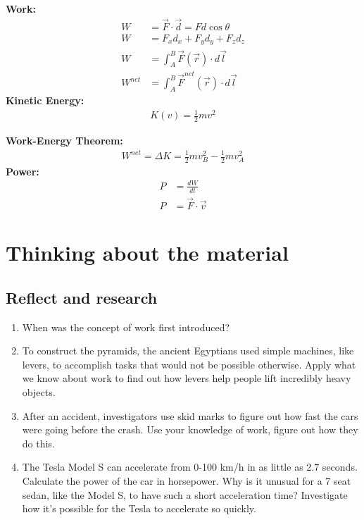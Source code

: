 \begin{importantEquations}
\begin{multicols}{2}
\textbf{Work:}
\begin{align*}
W &= \vec F \cdot \vec d = Fd\cos\theta\\
W &= F_xd_x+F_yd_y+F_zd_z\\
W &=\int_A^B \vec F(\vec r) \cdot  d\vec l\\
W^{net} &= \int_A^B \vec F^{net}(\vec r) \cdot d\vec l
\end{align*}
\textbf{Kinetic Energy:}
\begin{align*}
K(v) = \frac{1}{2} mv^2
\end{align*}
\columnbreak

\textbf{Work-Energy Theorem:}
\begin{align*}
W^{net} = \Delta K = \frac{1}{2} mv_B^2 - \frac{1}{2} mv_A^2
\end{align*}
\textbf{Power:}
\begin{align*}
P &= \frac{dW}{dt}\\
P &= \vec F \cdot \vec v
\end{align*}
\end{multicols}
\end{importantEquations}


\newpage
\section{Thinking about the material}
\subsection{Reflect and research}

\begin{enumerate}
\item When was the concept of work first introduced?
\item To construct the pyramids, the ancient Egyptians used simple machines, like levers, to accomplish tasks that would not be possible otherwise. Apply what we know about work to find out how levers help people lift incredibly heavy objects. 
\item After an accident, investigators use skid marks to figure out how fast the cars were going before the crash. Use your knowledge of work, figure out how they do this.
\item The Tesla Model S can accelerate from 0-100 \si{km/h} in as little as 2.7 seconds. Calculate the power of the car in horsepower. Why is it unusual for a 7 seat sedan, like the Model S, to have such a short acceleration time? Investigate how it's possible for the Tesla to accelerate so quickly. 
\end{enumerate}
